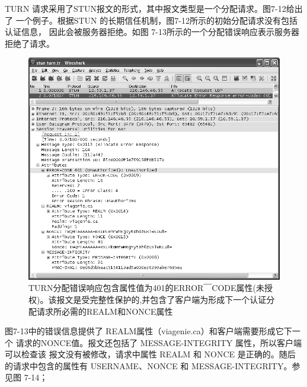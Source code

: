 TURN 请求采用了STUN报文的形式，其中报文类型是一个分配请求。图7-12给出了
一个例子。根据STUN 的长期信任机制，图7-12所示的初始分配请求没有包括认证信息，
因此会被服务器拒绝。如图 7-13所示的一个分配错误响应表示服务器拒绝了请求。

\begin{figure}[H]
  \centering
  \includegraphics[scale=0.5]{imgs/7/7-13.png}
  \caption{TURN分配错误响应包含属性值为401的ERROR￣CODE属性(未授权)。该报文是受完整性保护的,并包含了客户端为形成下一个认证分配请求所必需的REALM和NONCE属性}
\end{figure}

图7-13中的错误信息提供了 REALM属性（viagenie.ca）和客户端需要形成它下一个
请求的NONCE值。报文还包括了 MESSAGE-INTEGRITY 属性，所以客户端可以检查该
报文没有被修改，请求中属性 REALM 和 NONCE 是正确的。随后的请求中包含的属性有
USERNAME、NONCE 和 MESSAGE-INTEGRITY。参见图 7-14；


